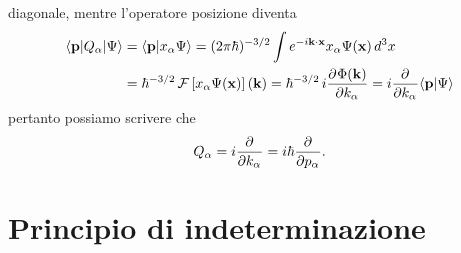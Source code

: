 diagonale, mentre l'operatore posizione diventa 
\begin{align*}
  \langle \mathbf{p} | Q_\alpha |\Psi \rangle &=  \langle \mathbf{p} | x_\alpha \Psi \rangle =  (2 \pi \hbar)^{-3/2} \int e^{ - i \mathbf{k \cdot x}} x_\alpha \Psi(\mathbf{x}) \,d^3x
  \\
  &= \hbar^{-3/2} \operatorname{\mathcal{F}}\left[ x_\alpha \Psi(\mathbf{x}) \right](\mathbf{k}) = \hbar^{-3/2}\, i \frac{\partial^{} {\Phi(\mathbf{k})}}{\partial {k_\alpha}^{}} = i \frac{\partial^{} {}}{\partial {k_\alpha}^{}} \langle \mathbf{p} | \Psi \rangle
\end{align*}
pertanto possiamo scrivere che 
\begin{align*}
  Q_\alpha = i \frac{\partial^{} {}}{\partial {k_\alpha}^{}} = i \hbar \frac{\partial^{} {}}{\partial {p_\alpha}^{}}.
\end{align*}

\section{Principio di indeterminazione}


